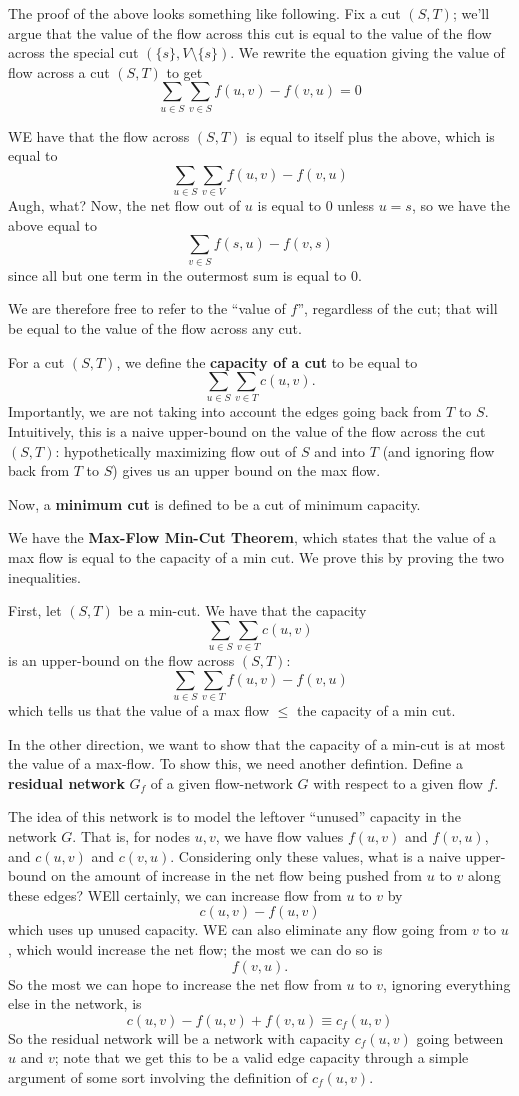 \documentclass{article}
\begin{document}
The proof of the above looks something like following.
Fix a cut $(S,T)$; we'll argue that the value of the flow across this cut is
 equal to the value of the flow across the special cut
$ \left(\{s\}, V\setminus \{s\}\right)$.
We rewrite the equation giving the value of flow across a cut $(S,T)$ to get
$$
\sum_{u\in S} \sum_{v \in S} f(u,v) - f(v,u) = 0
$$

WE have that the flow across $(S,T)$ is equal to itself plus the above,
which is equal to
$$
\sum_{u\in S}
\sum_{v\in V}
f(u,v) - f(v,u)
$$
Augh, what?
Now, the net flow out of $u$ is equal to $0$ unless $u=s$, so we
have the above equal to
$$
\sum_{v\in S} f(s,u) - f(v,s)
$$
since all but one term in the outermost sum is equal to $0$.

We are therefore free to refer to the ``value of $f$'', regardless of the cut;
that will be equal to the value of the flow across any cut.

For a cut $(S,T)$, we define the \textbf{capacity of a cut} to be
equal to
$$
\sum_{u\in S} \sum_{v\in T}
c(u,v).
$$
Importantly, we are not taking into account the edges going back
from $T$ to $S$.
Intuitively, this is a naive upper-bound on the value of the flow across
the cut $(S,T)$: hypothetically maximizing flow out of $S$ and into $T$
(and ignoring flow back from $T$ to $S$) gives us an upper bound on the 
max flow.

Now, a \textbf{minimum cut} is defined to be a cut of minimum capacity.

We have the \textbf{Max-Flow Min-Cut Theorem}, which states that
the value of a max flow is equal to the capacity of a min cut.
We prove this by proving the two inequalities.

First, let $(S,T)$ be a min-cut. We have that the capacity
$$
\sum_{u\in S} \sum_{v\in T}
c(u,v)
$$
is an upper-bound on the flow across $(S,T)$:
$$
\sum_{u\in S} \sum_{v\in T}
	f(u,v) - f(v,u)
$$
which tells us that the value of a max flow $\leq$ the capacity
of a min cut.

In the other direction, we want to show that the capacity of a min-cut is
at most the value of a max-flow.
To show this, we need another defintion.
Define a \textbf{residual network} $G_f$ of a given flow-network $G$ with
respect to a given flow $f$.

The idea of this network is to model the leftover ``unused'' capacity in the
network $G$.
That is, for nodes $u,v$, we have flow values $f(u,v)$
and $f(v,u)$, and $c(u,v)$ and $c(v,u)$. Considering only these values, what
is a naive upper-bound on the amount of increase in the net flow being pushed
from $u$ to $v$ along these edges?
WEll certainly, we can increase flow from $u$ to $v$ by
$$
c(u,v) - f(u,v)
$$
which uses up unused capacity.
WE can also eliminate any flow going from $v$ to $u$, which would
increase the net flow; the most we can do so is
$$
f(v,u).
$$
So the most we can hope to increase the net flow from $u$ to $v$, ignoring
everything else in the network, is
$$
c(u,v) - f(u,v) + f(v,u)
\equiv c_f(u,v)
$$
So the residual network will be a network with capacity $c_f(u,v)$ going
between $u$ and $v$; note that we get this to be a valid edge capacity
through a simple argument of some sort involving the definition of $c_f(u,v)$.
\end{document}
